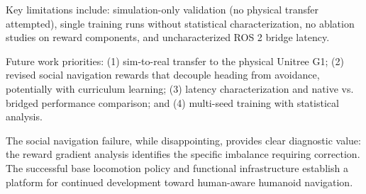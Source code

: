 \documentclass[12pt,a4paper]{article}
\begin{document}
Key limitations include: simulation-only validation (no physical transfer attempted), single training runs without statistical characterization, no ablation studies on reward components, and uncharacterized ROS 2 bridge latency.

Future work priorities: (1) sim-to-real transfer to the physical Unitree G1; (2) revised social navigation rewards that decouple heading from avoidance, potentially with curriculum learning; (3) latency characterization and native vs. bridged performance comparison; and (4) multi-seed training with statistical analysis.

The social navigation failure, while disappointing, provides clear diagnostic value: the reward gradient analysis identifies the specific imbalance requiring correction. The successful base locomotion policy and functional infrastructure establish a platform for continued development toward human-aware humanoid navigation.

\newpage



\printbibliography
\end{document}
